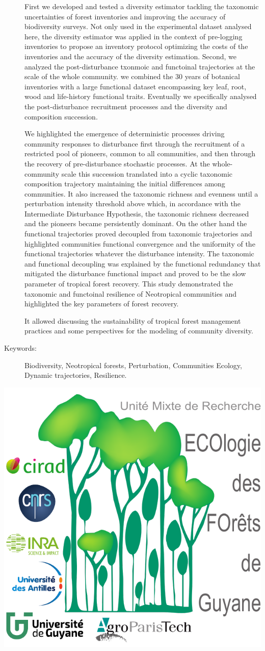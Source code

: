 \documentclass[
  11pt,
  french,
  A4paper,
  extrafontsizes,onecolumn,openright
  ]{memoir}
\begin{document}
\begin{normalsize}
\begin{description}
First we developed and tested a diversity estimator tackling the
taxonomic uncertainties of forest inventories and improving the accuracy
of biodiversity surveys. Not only used in the experimental dataset
analysed here, the diversity estimator was applied in the context of
pre-logging inventories to propose an inventory protocol optimizing the
costs of the inventories and the accuracy of the diversity estimation.
Second, we analyzed the post-disturbance txonmoic and functoinal
trajectories at the scale of the whole community. we combined the 30
years of botanical inventories with a large functional dataset
encompassing key leaf, root, wood and life-history functional traits.
Eventually we specifically analysed the post-disturbance recruitment
processes and the diversity and composition succession.

We highlighted the emergence of deterministic processes driving
community responses to disturbance first through the recruitment of a
restricted pool of pioneers, common to all communities, and then through
the recovery of pre-disturbance stochastic processes. At the
whole-community scale this succession translated into a cyclic taxonomic
composition trajectory maintaining the initial differences among
communities. It also increased the taxonomic richness and evenness until
a perturbation intensity threshold above which, in accordance with the
Intermediate Disturbance Hypothesis, the taxonomic richness decreased
and the pioneers became persistently dominant. On the other hand the
functional trajectories proved decoupled from taxonomic trajectories and
highlighted communities functional convergence and the uniformity of the
functional trajectories whatever the disturbance intensity. The
taxonomic and functional decoupling was explained by the functional
redundancy that mitigated the disturbance functional impact and proved
to be the slow parameter of tropical forest recovery. This study
demonstrated the taxonomic and functoinal resilience of Neotropical
communities and highlighted the key parameters of forest recovery.

It allowed discussing the sustainability of tropical forest management
practices and some perspectives for the modeling of community diversity.

\item[Keywords:]
Biodiversity, Neotropical forests, Perturbation, Communities Ecology, Dynamic trajectories, Resilience.

\end{description}

\end{normalsize}

\vspace*{\fill}
\centering\includegraphics[width=.3\textwidth]{images/Logo-Lab}
\end{document}
